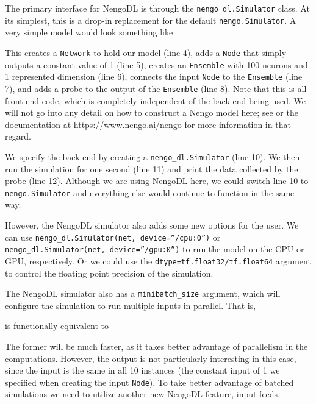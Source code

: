 \documentclass{article}
\begin{document}
The primary interface for NengoDL is through the \texttt{nengo\_dl.Simulator} class.  At its simplest, this is a drop-in replacement for the default \texttt{nengo.Simulator}.  A very simple model would look something like

\lstset{language=Python, numbers=left, columns=fixed, basicstyle=\ttfamily}


This creates a \texttt{Network} to hold our model (line 4), adds a \texttt{Node} that simply outputs a constant value of 1 (line 5), creates an \texttt{Ensemble} with 100 neurons and 1 represented dimension (line 6), connects the input \texttt{Node} to the \texttt{Ensemble} (line 7), and adds a probe to the output of the \texttt{Ensemble} (line 8).  Note that this is all front-end code, which is completely independent of the back-end being used.  We will not go into any detail on how to construct a Nengo model here; see \citet{Bekolay2014} or the documentation at \url{https://www.nengo.ai/nengo} for more information in that regard.

We specify the back-end by creating a \texttt{nengo\_dl.Simulator} (line 10).  We then run the simulation for one second (line 11) and print the data collected by the probe (line 12).  Although we are using NengoDL here, we could switch line 10 to \texttt{nengo.Simulator} and everything else would continue to function in the same way.

However, the NengoDL simulator also adds some new options for the user.  We can use \texttt{nengo\_dl.Simulator(net, device=''/cpu:0'')} or \texttt{nengo\_dl.Simulator(net, device=''/gpu:0'')} to run the model on the CPU or GPU, respectively.  Or we could use the \texttt{dtype=tf.float32/tf.float64} argument to control the floating point precision of the simulation.

The NengoDL simulator also has a \texttt{minibatch\_size} argument, which will configure the simulation to run multiple inputs in parallel.  That is,

\lstset{numbers=none}


is functionally equivalent to



The former will be much faster, as it takes better advantage of parallelism in the computations.  However, the output is not particularly interesting in this case, since the input is the same in all 10 instances (the constant input of 1 we specified when creating the input \texttt{Node}).  To take better advantage of batched simulations we need to utilize another new NengoDL feature, input feeds.
\end{document}
